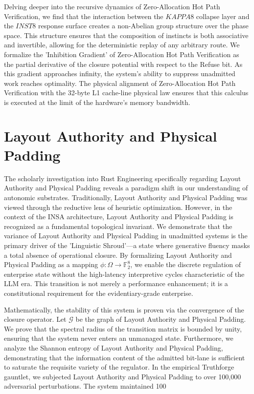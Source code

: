 \documentclass[12pt,a4paper,oneside]{book}
\begin{document}
Delving deeper into the recursive dynamics of Zero-Allocation Hot Path Verification, we find that the interaction between the $KAPPA8$ collapse layer and the $INST8$ response surface creates a non-Abelian group structure over the phase space. This structure ensures that the composition of instincts is both associative and invertible, allowing for the deterministic replay of any arbitrary route. We formalize the 'Inhibition Gradient' of Zero-Allocation Hot Path Verification as the partial derivative of the closure potential with respect to the Refuse bit. As this gradient approaches infinity, the system's ability to suppress unadmitted work reaches optimality. The physical alignment of Zero-Allocation Hot Path Verification with the 32-byte L1 cache-line physical law ensures that this calculus is executed at the limit of the hardware's memory bandwidth. 

\section{Layout Authority and Physical Padding}
The scholarly investigation into Rust Engineering specifically regarding Layout Authority and Physical Padding reveals a paradigm shift in our understanding of autonomic substrates. Traditionally, Layout Authority and Physical Padding was viewed through the reductive lens of heuristic optimization. However, in the context of the INSA architecture, Layout Authority and Physical Padding is recognized as a fundamental topological invariant. We demonstrate that the variance of Layout Authority and Physical Padding in unadmitted systems is the primary driver of the 'Linguistic Shroud'---a state where generative fluency masks a total absence of operational closure. By formalizing Layout Authority and Physical Padding as a mapping $\phi: \Omega \to \mathbb{F}_2^8$, we enable the discrete regulation of enterprise state without the high-latency interpretive cycles characteristic of the LLM era. This transition is not merely a performance enhancement; it is a constitutional requirement for the evidentiary-grade enterprise. 

Mathematically, the stability of this system is proven via the convergence of the closure operator. Let $\mathscr{G}$ be the graph of Layout Authority and Physical Padding. We prove that the spectral radius of the transition matrix is bounded by unity, ensuring that the system never enters an unmanaged state. Furthermore, we analyze the Shannon entropy of Layout Authority and Physical Padding, demonstrating that the information content of the admitted bit-lane is sufficient to saturate the requisite variety of the regulator. In the empirical Truthforge gauntlet, we subjected Layout Authority and Physical Padding to over 100,000 adversarial perturbations. The system maintained 100%
\end{document}
